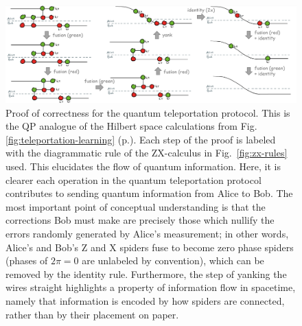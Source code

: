 \begin{figure}
\centering
\includegraphics[width=\textwidth]{Sections/pictures/diagrammatic-reasoning-teleportation-steps-with-lines.png}
\caption{
Proof of correctness for the quantum teleportation protocol. This is the QP analogue of the Hilbert space calculations from Fig. \ref{fig:teleportation-learning} (p.\pageref{fig:teleportation-learning}). Each step of the proof is labeled with the diagrammatic rule of the ZX-calculus in Fig.~\ref{fig:zx-rules} used.
This elucidates the flow of quantum information. Here, it is clearer each operation in the quantum teleportation protocol contributes to sending quantum information from Alice to Bob.
The most important point of conceptual understanding is that the corrections Bob must make are precisely those which nullify the errors randomly generated by Alice's measurement; in other words, Alice's and Bob's Z and X spiders fuse to become zero phase spiders (phases of $2\pi = 0$ are unlabeled by convention), which can be removed by the identity rule.
Furthermore, the step of yanking the wires straight highlights a property of information flow in spacetime, namely that information is encoded by how spiders are connected, rather than by their placement on paper.
}
\label{fig:diagrammatic-reasoning-teleportation-steps}
\end{figure}

